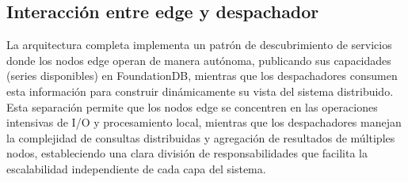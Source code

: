 \subsection{Interacción entre edge y despachador}

La arquitectura completa implementa un patrón de descubrimiento de servicios donde los nodos edge operan de manera autónoma, publicando sus capacidades (series disponibles) en FoundationDB, mientras que los despachadores consumen esta información para construir dinámicamente su vista del sistema distribuido. Esta separación permite que los nodos edge se concentren en las operaciones intensivas de I/O y procesamiento local, mientras que los despachadores manejan la complejidad de consultas distribuidas y agregación de resultados de múltiples nodos, estableciendo una clara división de responsabilidades que facilita la escalabilidad independiente de cada capa del sistema.
